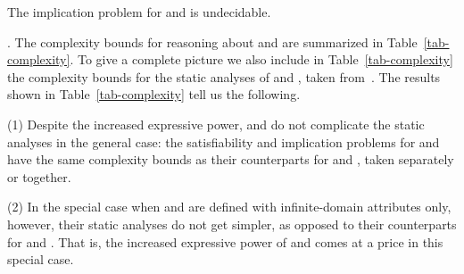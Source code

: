 \begin{cor}
\label{thm-IM-pcfd-pcind} The implication problem for \pCFDs and
\pCINDs is undecidable.
\end{cor}




. The complexity bounds for reasoning about
\pCFDs and \pCINDs are summarized in Table~\ref{tab-complexity}.
To give a complete picture we also include
in Table~\ref{tab-complexity} the complexity bounds for
the static analyses of
\CFDs and \CINDs, taken from~\cite{CFDs,tcs-CINDs}. The results shown in
Table~\ref{tab-complexity} tell us the following.

\sstab
(1) Despite the increased expressive
power, \pCFDs and \pCINDs do not complicate the static analyses in the general case: the
satisfiability and implication problems for \pCFDs and \pCINDs have
the same complexity bounds as their
counterparts for \CFDs and \CINDs, taken separately or together.

\sstab
(2) In the special case when \pCFDs and \pCINDs are defined
with infinite-domain attributes only, however, their
static analyses do not get simpler, as opposed to their counterparts for
\CFDs and \CINDs. That is, the increased expressive power of \pCFDs and \pCINDs comes at a price in this special case.
